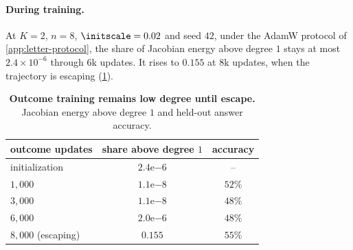 \begin{table}[H]
\centering\small
{}
\caption{\textbf{The answer-dependent gradient decays with horizon while the step gradient does not.} Gradient norms at initialization,
seed $42$.}
\label{tab:spectrum}
\label{tab:spectrum-full}
\end{table}

\paragraph{During training.} At $K=2$, $n=8$, $\initscale=0.02$ and seed $42$, under the AdamW protocol of \cref{app:letter-protocol},
the share of Jacobian energy above degree $1$ stays at most $2.4\times10^{-6}$ through $6$k updates.
It rises to $0.155$ at $8$k updates, when the trajectory is escaping (\cref{tab:main-evidence}).

\begin{table}[H]
\centering\small
\begin{tabular}{@{}lcc@{}}
\toprule
outcome updates & share above degree $1$ & accuracy\\
\midrule
initialization & $2.4\mathrm{e}{-6}$ & --\\
$1{,}000$ & $1.1\mathrm{e}{-8}$ & $52\%$\\
$3{,}000$ & $1.1\mathrm{e}{-8}$ & $48\%$\\
$6{,}000$ & $2.0\mathrm{e}{-6}$ & $48\%$\\
$8{,}000$ (escaping) & $0.155$ & $55\%$\\
\bottomrule
\end{tabular}
\caption{\textbf{Outcome training remains low degree until escape.} Jacobian energy above degree $1$ and held-out answer accuracy.}
\label{tab:main-evidence}
\end{table}

